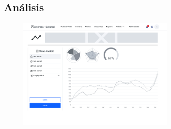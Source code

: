 \documentclass{article}
\begin{document}
\subsection{An\'alisis}
\begin{figure}[h]
\centering
\includegraphics[width=0.7\textwidth]{wireframe/Analisis.png}
\end{figure}
\end{document}
